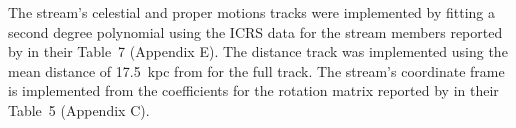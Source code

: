The stream's celestial and proper motions tracks were implemented by fitting a second degree polynomial using the ICRS data for the stream members reported by \citet{Shipp2019} in their Table~7 (Appendix E). The distance track was implemented using the mean distance of 17.5~kpc from \citet{Balbinot2016} for the full track. The stream's coordinate frame is implemented from the coefficients for the rotation matrix reported by \citet{Shipp2019} in their Table~5 (Appendix C).
